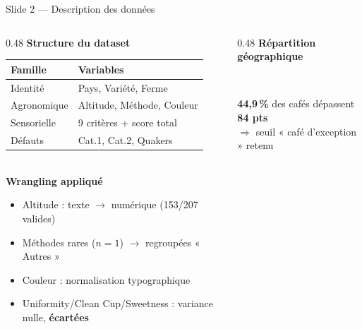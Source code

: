 \documentclass[aspectratio=169,12pt]{beamer}
\begin{document}
\begin{frame}{\faDatabase\quad Slide 2 — Description des données}
\vspace{-0.3cm}
\begin{columns}[T]
\begin{column}{0.48\textwidth}
  \textbf{\textcolor{coffeebrown}{Structure du dataset}}\\[0.2cm]
  \begin{tabular}{@{}ll@{}}
    \toprule
    \rowcolor{coffeecream}
    Famille & Variables \\
    \midrule
    Identité & Pays, Variété, Ferme\\
    Agronomique & Altitude, Méthode, Couleur\\
    Sensorielle & 9 critères + score total\\
    Défauts & Cat.1, Cat.2, Quakers\\
    \bottomrule
  \end{tabular}\\[0.4cm]

  \textbf{\textcolor{coffeebrown}{Wrangling appliqué}}
  \begin{itemize}\small
    \item Altitude : texte $\to$ numérique (153/207 valides)
    \item Méthodes rares ($n=1$) $\to$ regroupées « Autres »
    \item Couleur : normalisation typographique
    \item Uniformity/Clean Cup/Sweetness : variance nulle, \textbf{écartées}
  \end{itemize}
\end{column}
\begin{column}{0.48\textwidth}
  \textbf{\textcolor{coffeebrown}{Répartition géographique}}\\[0.2cm]
  \\[0.2cm]
  \begin{statbox}
    \small\textbf{44,9\,\%} des cafés dépassent \textbf{84 pts}\\
    $\Rightarrow$ seuil « café d'exception » retenu
  \end{statbox}
\end{column}
\end{columns}
\end{frame}
\end{document}

